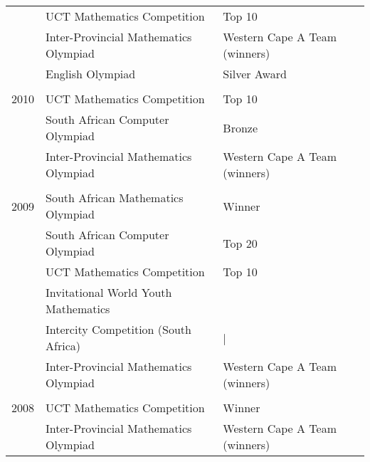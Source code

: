 \begin{tabular}{R{1cm}|ll}
& UCT Mathematics Competition & Top 10\\
& Inter-Provincial Mathematics Olympiad&Western Cape A Team (winners)\\
& English Olympiad & Silver Award\\
&&\\
2010 & UCT Mathematics Competition & Top 10\\
& South African Computer Olympiad& Bronze\\
& Inter-Provincial Mathematics Olympiad&Western Cape A Team (winners)\\
&&\\
2009 & South African Mathematics Olympiad& Winner\\
& South African Computer Olympiad& Top 20\\
& UCT Mathematics Competition & Top 10\\
& Invitational World Youth Mathematics&\\
&\hspace{1cm} Intercity Competition (South Africa)&|\\
& Inter-Provincial Mathematics Olympiad&Western Cape A Team (winners)\\
&&\\
2008 & UCT Mathematics Competition & Winner\\
& Inter-Provincial Mathematics Olympiad&Western Cape A Team (winners)\\
\end{tabular}

